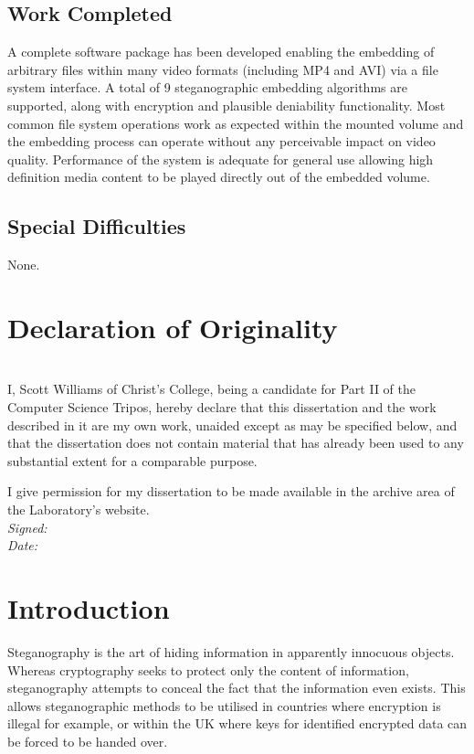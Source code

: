 \documentclass[paper=a4, fontsize=11pt,twoside]{scrartcl}    %
\numberwithin{table}{section}
\numberwithin{figure}{section}
\numberwithin{algorithm}{section}
\begin{document}
\subsection*{Work Completed}
A complete software package has been developed enabling the embedding of arbitrary files within many video formats (including MP4 and AVI) via a file system interface. A total of 9 steganographic embedding algorithms are supported, along with encryption and plausible deniability functionality. Most common file system operations work as expected within the mounted volume and the embedding process can operate without any perceivable impact on video quality. Performance of the system is adequate for general use allowing high definition media content to be played directly out of the embedded volume.

\subsection*{Special Difficulties}
None.

\pagebreak
\section*{Declaration of Originality}
~\\[5pt]
I, Scott Williams of Christ's College, being a candidate for Part II of the Computer
Science Tripos, hereby declare that this dissertation and the work described
in it are my own work, unaided except as may be specified below, and that
the dissertation does not contain material that has already been used to any
substantial extent for a comparable purpose.

I give permission for my dissertation to be made available in the archive
area of the Laboratory's website.\\[20pt]
\textit{Signed:}\\[20pt]
\textit{Date:}
\clearpage

\tableofcontents
\vfill

\pagebreak
{} 
\section{Introduction}
Steganography is the art of hiding information in apparently innocuous objects. Whereas cryptography seeks to protect only the content of information, steganography attempts to conceal the fact that the information even exists. This allows steganographic methods to be utilised in countries where encryption is illegal for example, or within the UK where keys for identified encrypted data can be forced to be handed over.
\end{document}
